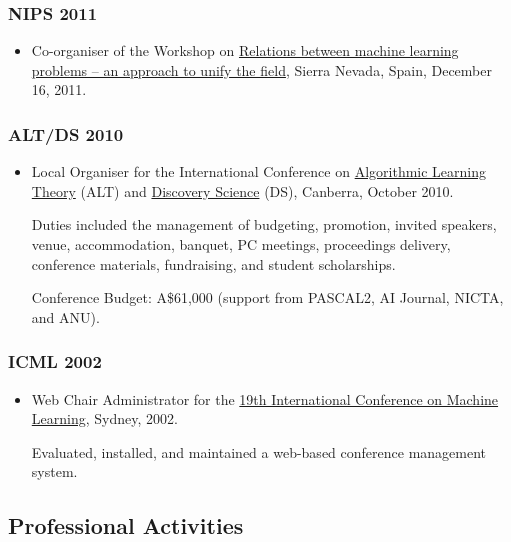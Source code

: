 \documentclass{article}
\begin{document}
\hypertarget{nips_2011}{}\subsubsection*{{NIPS 2011}}\label{nips_2011}

\begin{itemize}%
\item Co-organiser of the Workshop on \href{http://rml.cecs.anu.edu.au/}{Relations between machine learning problems – an approach to unify the field}, Sierra Nevada, Spain, December 16, 2011.

\end{itemize}
\hypertarget{altds_2010}{}\subsubsection*{{ALT/DS 2010}}\label{altds_2010}

\begin{itemize}%
\item Local Organiser for the International Conference on \href{http://www-alg.ist.hokudai.ac.jp/~thomas/ALT10/alt10.jhtml}{Algorithmic Learning Theory} (ALT) and \href{http://www.cse.unsw.edu.au/~achim/DS10/}{Discovery Science} (DS), Canberra, October 2010.

Duties included the management of budgeting, promotion, invited speakers, venue, accommodation, banquet, PC meetings, proceedings delivery, conference materials, fundraising, and student scholarships.

Conference Budget: A\$61,000 (support from PASCAL2, AI Journal, NICTA, and ANU).



\end{itemize}
\hypertarget{icml_2002}{}\subsubsection*{{ICML 2002}}\label{icml_2002}

\begin{itemize}%
\item Web Chair Administrator for the \href{http://www.cse.unsw.edu.au/~icml2002/}{19th International Conference on Machine Learning}, Sydney, 2002.

Evaluated, installed, and maintained a web-based conference management system.



\end{itemize}
\hypertarget{professional_activities}{}\subsection*{{Professional Activities}}\label{professional_activities}
\end{document}
